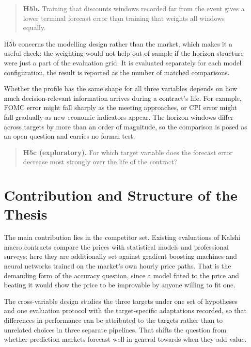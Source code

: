\documentclass[12pt,a4paper]{report}
\begin{document}
\begin{quote}
\textbf{H5b.} Training that discounts windows recorded far from the event
gives a lower terminal forecast error than training that weights all windows
equally.
\end{quote}

H5b concerns the modelling design rather than the market, which makes it a
useful check: the weighting would not help out of sample if the horizon structure were just a part of the evaluation grid. It is evaluated separately for
each model configuration,
the result is reported as the number of matched comparisons.

Whether the profile has the same shape for all three variables depends on how
much decision-relevant information arrives during a contract's life. For example, FOMC error might fall sharply as the meeting approaches, or CPI error might fall gradually as new economic indicators appear. The horizon windows differ across
targets by more than an order of magnitude, so the comparison is posed as an
open question and carries no formal test.

\begin{quote}
\textbf{H5c (exploratory).} For which target variable does the forecast error
decrease most strongly over the life of the contract?
\end{quote}

\section{Contribution and Structure of the Thesis}
\label{sec:contribution}

The main contribution lies in the competitor set. Existing evaluations of
Kalshi macro contracts compare the prices with statistical models and
professional surveys; here they are additionally set against gradient boosting
machines and neural networks trained on the market's own hourly price paths.
That is the demanding form of the accuracy question, since a model fitted to
the price and beating it would show the price to be improvable by anyone
willing to fit one.

The cross-variable design studies
the three targets under one set of hypotheses and one evaluation protocol with
the target-specific adaptations recorded, so that differences in performance
can be attributed to the targets rather than to unrelated choices in three
separate pipelines. That shifts the question from whether prediction markets
forecast well in general towards when they add value.
\end{document}
